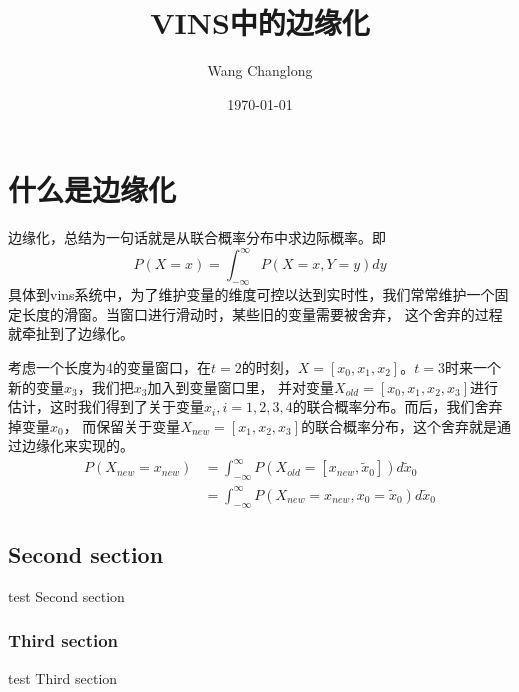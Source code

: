 \documentclass[a4pape,oneside,10pt]{article}
\title{VINS中的边缘化}
\author{Wang Changlong}
\date{\ukdate\today}
\begin{document}
\section{什么是边缘化}
边缘化，总结为一句话就是从联合概率分布中求边际概率。即
\begin{equation}
    P(X=x) = \int_{ -\infty}^{\infty}  P(X=x, Y=y) dy
\end{equation}
具体到vins系统中，为了维护变量的维度可控以达到实时性，我们常常维护一个固定长度的滑窗。当窗口进行滑动时，某些旧的变量需要被舍弃，
这个舍弃的过程就牵扯到了边缘化。

考虑一个长度为4的变量窗口，在$t=2$的时刻，$X=[x_0, x_1, x_2]$。$t=3$时来一个新的变量$x_3$，我们把$x_3$加入到变量窗口里，
并对变量$X_{old}=[x_0, x_1, x_2, x_3]$进行估计，这时我们得到了关于变量$x_i, i=1,2,3,4$的联合概率分布。而后，我们舍弃掉变量$x_0$，
而保留关于变量$X_{new}=[x_1, x_2, x_3]$的联合概率分布，这个舍弃就是通过边缘化来实现的。
\begin{equation}
\begin{aligned}
    P(X_{new}=x_{new}) 
    &= \int_{ -\infty}^{\infty}  P(X_{old}=[x_{new}, \tilde{x}_{0}]) d{\tilde{x}_0} \\
    &= \int_{ -\infty}^{\infty}  P(X_{new}=x_{new}, x_0=\tilde{x}_{0}) d{\tilde{x}_0}
\end{aligned}
\end{equation}

\subsection{Second section}
test Second section
\subsubsection{Third section}
test Third section
\end{document}

